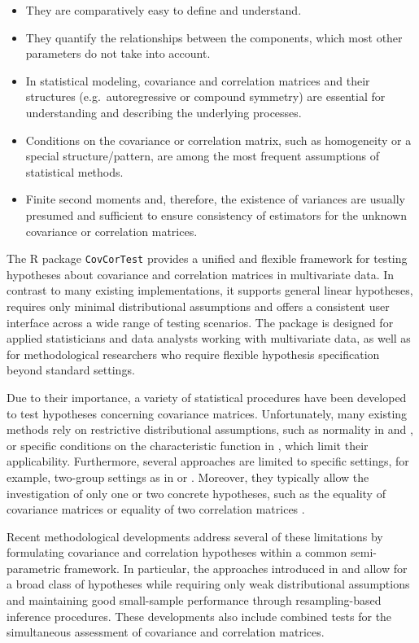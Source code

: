 \begin{itemize}
\item
  They are comparatively easy to define and understand.
\item
  They quantify the relationships between the components, which most other
  parameters do not take into account.
\item
  In statistical modeling, covariance and correlation matrices and their
  structures (e.g.~autoregressive or compound symmetry) are essential for
  understanding and describing the underlying processes.
\item
  Conditions on the covariance or correlation matrix, such as homogeneity or a
  special structure/pattern, are among the most frequent assumptions of
  statistical methods.
\item
  Finite second moments and, therefore, the existence of variances are usually
  presumed and sufficient to ensure consistency of estimators for the unknown
  covariance or correlation matrices.
\end{itemize}

The R package \texttt{CovCorTest} provides a unified and flexible framework for
testing hypotheses about covariance and correlation matrices in multivariate
data. In contrast to many existing implementations, it supports general linear
hypotheses, requires only minimal distributional assumptions and offers a
consistent user interface across a wide range of testing scenarios. The package
is designed for applied statisticians and data analysts working with
multivariate data, as well as for methodological researchers who require
flexible hypothesis specification beyond standard settings.

Due to their importance, a variety of statistical procedures have been
developed to test hypotheses concerning covariance matrices. Unfortunately,
many existing methods rely on restrictive distributional assumptions, such as
normality in \citet{box1953} and \citet{zhong2017}, or specific conditions on
the characteristic function in \citet{gupta2006}, which limit their
applicability. Furthermore, several approaches are limited to specific
settings, for example, two-group settings as in \citet{sakaori2002} or
\citet{omelka2012}. Moreover, they typically allow the investigation of only
one or two concrete hypotheses, such as the equality of covariance matrices
\citep[e.g.,][]{yang2012, zhu2002} or equality of two correlation
matrices \citep[e.g.,][]{jennrich1970}.

Recent methodological developments address several of these limitations by
formulating covariance and correlation hypotheses within a common
semi-parametric framework. In particular, the approaches introduced in
\citet{sattler2022} and \citet{sattler2023} allow for a broad class of
hypotheses while requiring only weak distributional assumptions and maintaining
good small-sample performance through resampling-based inference procedures.
These developments also include combined tests for the simultaneous assessment
of covariance and correlation matrices.

